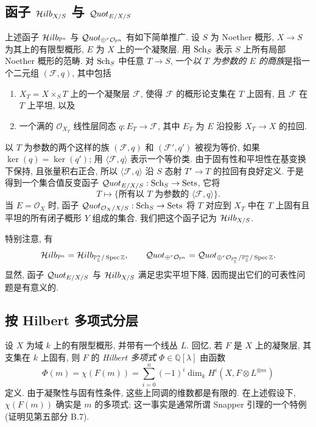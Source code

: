 \subsection{\texorpdfstring{函子 $\mathcal{H}ilb_{X/S}$ 与 $\mathcal{Q}uot_{E/X/S}$}{相对 Hilbert 函子与 Quot 函子}}\label{ch05:sec5.1.3}
上述函子 $\mathcal{H}ilb_{\mathbb P^n}$ 与 $\mathcal{Q}uot_{\oplus^r\mathcal O_{\mathbb P^n}}$ 有如下简单推广. 设 $S$ 为 Noether 概形, $X\to S$ 为其上的有限型概形, $E$ 为 $X$ 上的一个凝聚层. 用 $\mathrm{Sch}_S$ 表示 $S$ 上所有局部 Noether 概形的范畴. 对 $\mathrm{Sch}_S$ 中任意 $T\to S$, 一个\emph{以 $T$ 为参数的 $E$ 的商族}是指一个二元组 $(\mathcal F,q)$, 其中包括
\begin{enumerate}
\item[(i)] $X_T=X\times_S T$ 上的一个凝聚层 $\mathcal F$, 使得 $\mathcal F$ 的概形论支集在 $T$ 上固有, 且 $\mathcal F$ 在 $T$ 上平坦, 以及
\item[(ii)] 一个满的 $\mathcal O_{X_T}$ 线性层同态 $q:E_T\to\mathcal F$, 其中 $E_T$ 为 $E$ 沿投影 $X_T\to X$ 的拉回.
\end{enumerate}
以 $T$ 为参数的两个这样的族 $(\mathcal F,q)$ 和 $(\mathcal F',q')$ 被视为等价, 如果 $\ker(q)=\ker(q')$; 用 $\langle\mathcal F,q\rangle$ 表示一个等价类. 由于固有性和平坦性在基变换下保持, 且张量积右正合, 所以 $\langle\mathcal F,q\rangle$ 沿 $S$ 态射 $T'\to T$ 的拉回有良好定义. 于是得到一个集合值反变函子 $\mathcal{Q}uot_{E/X/S}:\mathrm{Sch}_S\to\mathrm{Sets}$, 它将
\[
 T\longmapsto\{\text{所有以 }T\text{ 为参数的 }\langle\mathcal F,q\rangle\}.
\]
当 $E=\mathcal O_X$ 时, 函子 $\mathcal{Q}uot_{\mathcal O_X/X/S}:\mathrm{Sch}_S\to\mathrm{Sets}$ 将 $T$ 对应到 $X_T$ 中在 $T$ 上固有且平坦的所有闭子概形 $Y$ 组成的集合. 我们把这个函子记为 $\mathcal{H}ilb_{X/S}$.

特别注意, 有
\[
 \mathcal{H}ilb_{\mathbb P^n}=\mathcal{H}ilb_{\mathbb P^n_{\mathbb Z}/\operatorname{Spec}\mathbb Z},\qquad
 \mathcal{Q}uot_{\oplus^r\mathcal O_{\mathbb P^n}}=
 \mathcal{Q}uot_{\oplus^r\mathcal O_{\mathbb P^n_{\mathbb Z}}/\mathbb P^n_{\mathbb Z}/\operatorname{Spec}\mathbb Z}.
\]
显然, 函子 $\mathcal{Q}uot_{E/X/S}$ 与 $\mathcal{H}ilb_{X/S}$ 满足忠实平坦下降, 因而提出它们的可表性问题是有意义的.

\subsection{按 Hilbert 多项式分层}\label{ch05:sec5.1.4}
设 $X$ 为域 $k$ 上的有限型概形, 并带有一个线丛 $L$. 回忆, 若 $F$ 是 $X$ 上的凝聚层, 其支集在 $k$ 上固有, 则 $F$ 的 \emph{Hilbert 多项式} $\Phi\in\mathbb Q[\lambda]$ 由函数
\[
 \Phi(m)=\chi(F(m))=\sum_{i=0}^n(-1)^i\dim_k H^i(X,F\otimes L^{\otimes m})
\]
定义. 由于凝聚性与固有性条件, 这些上同调的维数都是有限的. 在上述假设下, $\chi(F(m))$ 确实是 $m$ 的多项式; 这一事实是通常所谓 Snapper 引理的一个特例 (证明见第五部分 B.7).

